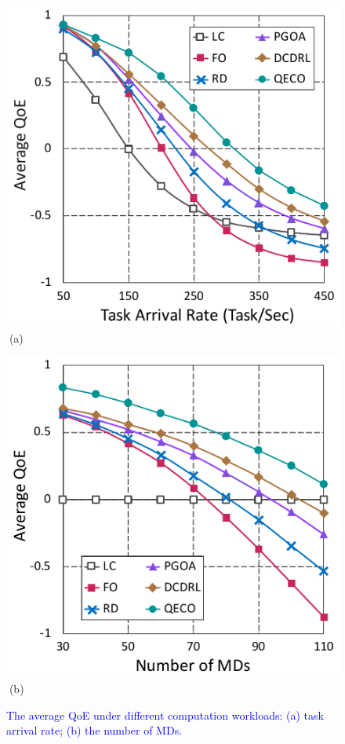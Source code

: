 \documentclass[10pt, journal,letterpaper]{IEEEtran}
\begin{document}
\begin{figure}[tbp]
	\captionsetup{name=Fig.}
	\begin{minipage}[b]{0.50\linewidth}
		\centering
		\includegraphics[width=\textwidth]{ qoe_1} 		
		\textcolor{white}{i}\hspace{0.6cm}(a)
	\end{minipage}
	\hspace{-0.2cm}
	\begin{minipage}[b]{0.50\linewidth}
		\centering
		\includegraphics[width=\textwidth]{ qoe_2}
		\textcolor{white}{i}\hspace{0.6cm}(b)
	\end{minipage}
	\vspace{-0.7cm}
	\caption{\textcolor{blue}{The average QoE under different computation workloads: (a) task arrival rate; (b) the number of MDs.}}
	\label{chart4}
\end{figure} 
\end{document}
